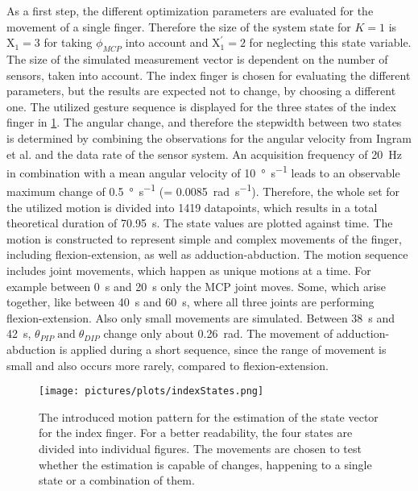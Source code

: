 As a first step, the different optimization parameters are evaluated for the movement of a single finger. Therefore the size of the system state for $ K = 1 $ is $ \mathrm{X}_{1} = 3 $ for taking $ \phi_{MCP} $ into account and $ \mathrm{X}^\prime_{1} = 2 $ for neglecting this state variable. The size of the simulated measurement vector is dependent on the number of sensors, taken into account. The index finger is chosen for evaluating the different parameters, but the results are expected not to change, by choosing a different one. The utilized gesture sequence is displayed for the three states of the index finger in \ref{fig:indexStates}. The angular change, and therefore the stepwidth between two states is determined by combining the observations for the angular velocity from Ingram et al. \cite{ingram2008statistics} and the data rate of the sensor system. An acquisition frequency of \SI{20}{\Hz} in combination with a mean angular velocity of \SI[per-mode=symbol]{10}{\degree \per \second} leads to an observable maximum change of \SI[per-mode=symbol]{0.5}{\degree \per \second} (= \SI[per-mode=symbol]{0.0085}{\radian \per \second}). Therefore, the whole set for the utilized motion is divided into 1419 datapoints, which results in a total theoretical duration of \SI{70.95}{\second}. The state values are plotted against time. The motion is constructed to represent simple and complex movements of the finger, including flexion-extension, as well as adduction-abduction. The motion sequence includes joint movements, which happen as unique motions at a time. For example between \SI{0}{\second} and \SI{20}{\second} only the \ac{MCP} joint moves. Some, which arise together, like between \SI{40}{\second} and \SI{60}{\second}, where all three joints are performing flexion-extension. Also only small movements are simulated. Between \SI{38}{\second} and \SI{42}{\second}, $ \theta_{PIP} \; \text{and} \; \theta_{DIP} $ change only about \SI{0.26}{\radian}. The movement of adduction-abduction is applied during a short sequence, since the range of movement is small and also occurs more rarely, compared to flexion-extension.\\
\begin{figure}[!htb]
\centering
\texttt{[image: pictures/plots/indexStates.png]}
\caption[Introduced movement pattern for index finger estimation]
{The introduced motion pattern for the estimation of the state vector for the index finger. For a better readability, the four states are divided into individual figures. The movements are chosen to test whether the estimation is capable of changes, happening to a single state or a combination of them.}
\label{fig:indexStates}
\end{figure}
